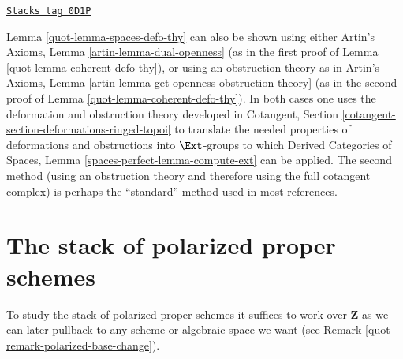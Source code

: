 \begin{remark}
\label{quot-remark-spaces-defo-thy}
\href{https://stacks.math.columbia.edu/tag/0D1P}{\texttt{Stacks tag 0D1P}}

Lemma \ref{quot-lemma-spaces-defo-thy} can also be shown using either
Artin's Axioms, Lemma \ref{artin-lemma-dual-openness}
(as in the first proof of
Lemma \ref{quot-lemma-coherent-defo-thy}), or using an obstruction theory
as in Artin's Axioms, Lemma \ref{artin-lemma-get-openness-obstruction-theory}
(as in the second proof of
Lemma \ref{quot-lemma-coherent-defo-thy}).
In both cases one uses the deformation and obstruction theory developed in
Cotangent, Section \ref{cotangent-section-deformations-ringed-topoi}
to translate the needed properties of deformations and obstructions
into $\Ext$-groups to which
Derived Categories of Spaces, Lemma
\ref{spaces-perfect-lemma-compute-ext}
can be applied.
The second method (using an obstruction theory and therefore
using the full cotangent complex) is perhaps the ``standard'' method used
in most references.
\end{remark}

\section{The stack of polarized proper schemes}
\label{quot-section-polarized}
To study the stack of polarized proper schemes it suffices to work
over $\mathbf{Z}$ as we can later pullback to any scheme or algebraic
space we want (see Remark \ref{quot-remark-polarized-base-change}).

